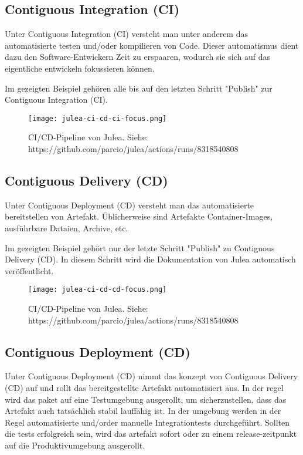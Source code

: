 \subsection{Contiguous Integration (CI)}

Unter Contiguous Integration (CI) versteht man unter anderem das automatisierte testen und/oder kompilieren von Code.  Dieser automatismus dient dazu den Software-Entwickern Zeit zu erspaaren, wodurch sie sich auf das eigentliche entwickeln fokussieren können.

Im gezeigten Beispiel gehören alle bis auf den letzten Schritt "Publish" zur Contiguous Integration (CI).

\begin{figure}[H]
    \texttt{[image: julea-ci-cd-ci-focus.png]}
    \caption{CI/CD-Pipeline von Julea. \newline
        Siehe: https://github.com/parcio/julea/actions/runs/8318540808}
\end{figure}

\subsection{Contiguous Delivery (CD)}

Unter Contiguous Deployment (CD) versteht man das automatisierte bereitstellen von Artefakt. Üblicherweise sind Artefakte Container-Images, ausführbare Dataien, Archive, etc.

Im gezeigten Beispiel gehört nur der letzte Schritt "Publish" zu Contiguous Delivery (CD). In diesem Schritt wird die Dokumentation von Julea automatisch veröffentlicht.

\begin{figure}[H]
    \texttt{[image: julea-ci-cd-cd-focus.png]}
    \caption{CI/CD-Pipeline von Julea. \newline
        Siehe: https://github.com/parcio/julea/actions/runs/8318540808}
\end{figure}

\subsection{Contiguous Deployment (CD)}

Unter Contiguous Deployment (CD) nimmt das konzept von Contiguous Delivery (CD) auf und rollt das bereitgestellte Artefakt automatisiert aus. In der regel wird das paket auf eine Testumgebung ausgerollt, um sicherzustellen, dass das Artefakt auch tatsächlich stabil lauffähig ist. In der umgebung werden in der Regel automatisierte und/order manuelle Integrationtests durchgeführt. Sollten die tests erfolgreich sein, wird das artefakt sofort oder zu einem release-zeitpunkt auf die Produktivumgebung ausgerollt.

